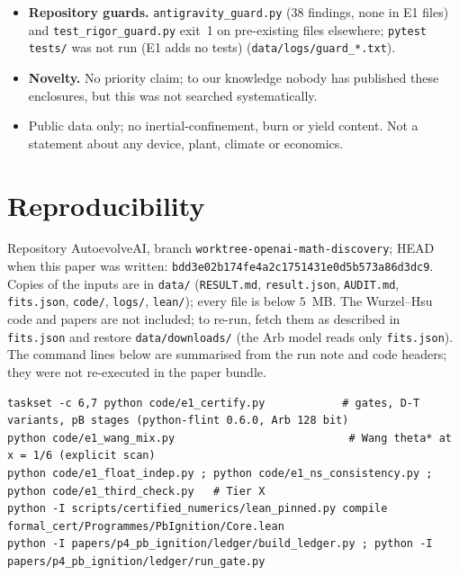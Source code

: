 \documentclass[10pt]{article}
\begin{document}
\begin{itemize}
\item \textbf{Repository guards.} \texttt{antigravity\_guard.py} (38 findings, none in E1 files) and \texttt{test\_rigor\_guard.py} exit~1 on pre-existing files elsewhere; \texttt{pytest tests/} was not run (E1 adds no tests) (\texttt{data/logs/guard\_*.txt}).
\item \textbf{Novelty.} No priority claim; to our knowledge nobody has published these enclosures, but this was not searched systematically.
\item Public data only; no inertial-confinement, burn or yield content. Not a statement about any device, plant, climate or economics.
\end{itemize}

\section{Reproducibility}\label{sec:repro}
Repository AutoevolveAI, branch \texttt{worktree-openai-math-discovery}; HEAD when this paper was written: \texttt{bdd3e02b174fe4a2c1751431e0d5b573a86d3dc9}. Copies of the inputs are in \texttt{data/} (\texttt{RESULT.md}, \texttt{result.json}, \texttt{AUDIT.md}, \texttt{fits.json}, \texttt{code/}, \texttt{logs/}, \texttt{lean/}); every file is below $5$~MB. The Wurzel--Hsu code and papers are not included; to re-run, fetch them as described in \texttt{fits.json} and restore \texttt{data/downloads/} (the Arb model reads only \texttt{fits.json}). The command lines below are summarised from the run note and code headers; they were not re-executed in the paper bundle.
\begin{lstlisting}[basicstyle=\ttfamily\scriptsize]
taskset -c 6,7 python code/e1_certify.py            # gates, D-T variants, pB stages (python-flint 0.6.0, Arb 128 bit)
python code/e1_wang_mix.py                           # Wang theta* at x = 1/6 (explicit scan)
python code/e1_float_indep.py ; python code/e1_ns_consistency.py ; python code/e1_third_check.py   # Tier X
python -I scripts/certified_numerics/lean_pinned.py compile formal_cert/Programmes/PbIgnition/Core.lean
python -I papers/p4_pb_ignition/ledger/build_ledger.py ; python -I papers/p4_pb_ignition/ledger/run_gate.py
\end{lstlisting}
\end{document}
